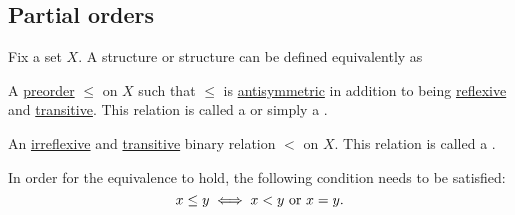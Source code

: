 \subsection{Partial orders}\label{subsec:partial_orders}

\begin{Definition}\label{def:poset}
  Fix a set \( X \). A  structure or  structure can be defined equivalently as
  \begin{DefEnum}
     A \hyperref[def:preordered_set]{preorder} \( \leq \) on \( X \) such that \( \leq \) is \hyperref[def:binary_relation/antisymmetric]{antisymmetric} in addition to being \hyperref[def:binary_relation/reflexive]{reflexive} and \hyperref[def:binary_relation/transitive]{transitive}. This relation is called a  or simply a .

     An \hyperref[def:binary_relation/irreflexive]{irreflexive} and \hyperref[def:binary_relation/transitive]{transitive} binary relation \( < \) on \( X \). This relation is called a .
  \end{DefEnum}

  In order for the equivalence to hold, the following condition needs to be satisfied:
  \begin{equation*}
    x \leq y \iff x < y \text{ or } x = y.
  \end{equation*}
\end{Definition}
